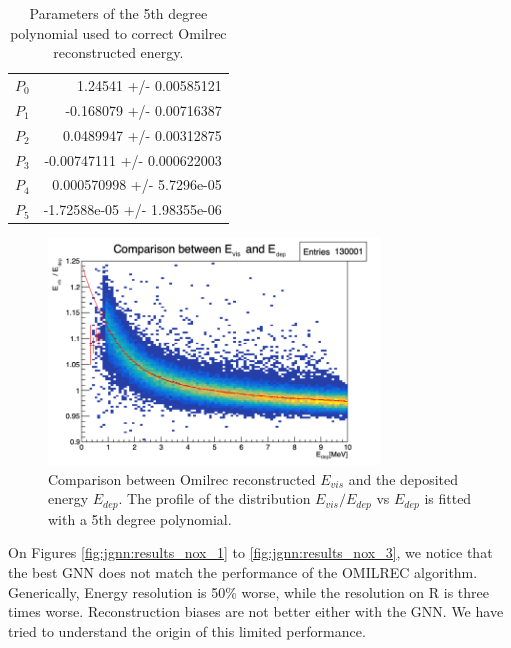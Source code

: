 \documentclass[../main.tex]{subfiles}
\begin{document}
\begin{table}[ht]
  \centering
  \begin{tabular}{|l|r|}
    $P_0$                        &      1.24541   +/-   0.00585121  \\
    $P_1$                        &    -0.168079   +/-   0.00716387  \\
    $P_2$                        &    0.0489947   +/-   0.00312875  \\
    $P_3$                        &  -0.00747111   +/-   0.000622003 \\
    $P_4$                        &  0.000570998   +/-   5.7296e-05  \\
    $P_5$                        & -1.72588e-05   +/-   1.98355e-06 \\
  \end{tabular}
  \caption{Parameters of the 5th degree polynomial used to correct Omilrec reconstructed energy.}
  \label{tab:annex:evis:omil_params}
\end{table}

\begin{figure}[ht]
  \centering
  \includegraphics[height=6cm]{images/jgnn/e_rec_e_true_comp.png}
  \caption{Comparison between Omilrec reconstructed $E_{vis}$ and the deposited energy $E_{dep}$. The profile of the distribution $E_{vis}/E_{dep}$ vs $E_{dep}$ is fitted with a 5th degree polynomial.}
  \label{fig:annex:evis:e_rec_correction}
\end{figure}

On Figures \ref{fig:jgnn:results_nox_1} to \ref{fig:jgnn:results_nox_3}, we notice that the best GNN does not match the performance of the OMILREC algorithm. Generically, Energy resolution is 50\% worse, while the resolution on R is three times worse. Reconstruction biases are not better either with the GNN. We have tried to understand the origin of this limited performance.
\end{document}
